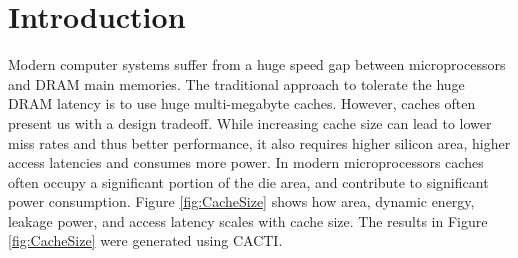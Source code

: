 
\chapter{Introduction}
\label{ch:Introduction}

Modern computer systems suffer from a huge speed gap between microprocessors and DRAM main memories. The traditional approach to tolerate the huge DRAM latency is to use huge multi-megabyte caches. However, caches often present us with a design tradeoff. While increasing cache size can lead to lower miss rates and thus better performance, it also requires higher silicon area, higher access latencies and consumes more power\cite{skadron1999branch}. In modern microprocessors caches often occupy a significant portion of the die area, and contribute to significant power consumption\cite{skylake,power9}. Figure \ref{fig:CacheSize} shows how area, dynamic energy, leakage power, and access latency scales with cache size. The results in Figure \ref{fig:CacheSize} were generated using CACTI\cite{cacti}.\par
